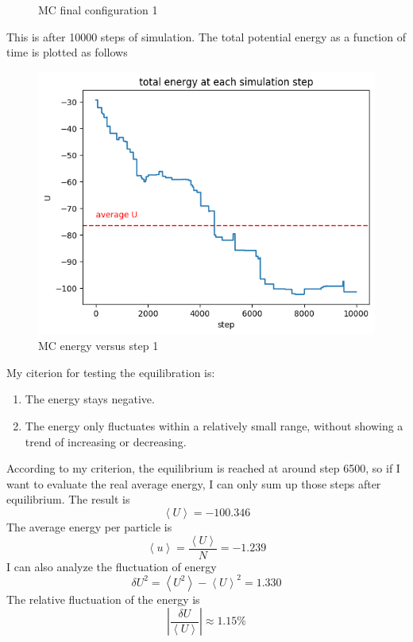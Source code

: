 \documentclass[letterpaper,12pt]{article}
\numberwithin{equation}{section}
\begin{document}
\begin{enumerate}[label=(\alph*)]
\begin{figure}[H]
        \caption{MC final configuration 1}
    \end{figure}
    This is after 10000 steps of simulation. The total potential energy as a function of time is plotted as follows
    \begin{figure}[H]
        \centering
        \includegraphics[width=.8\textwidth]{energy_to_time_mc1.png}
        \caption{MC energy versus step 1}
    \end{figure}
    My citerion for testing the equilibration is:
    \begin{enumerate}[label=\textbullet]
        \item The energy stays negative.
        \item The energy only fluctuates within a relatively small range, without showing a trend of increasing or decreasing.
    \end{enumerate}
    According to my criterion, the equilibrium is reached at around step 6500, so if I want to evaluate the real average energy, I can only sum up those steps after equilibrium. The result is 
    \begin{equation}
        \left \langle U\right\rangle=-100.346
    \end{equation}
    The average energy per particle is 
    \begin{equation}
        \left\langle u\right\rangle=\frac{\left \langle U\right\rangle}{N}=-1.239
    \end{equation}
    I can also analyze the fluctuation of energy
    \begin{equation}
        \delta U^2=\left \langle U^2\right\rangle-\left \langle U\right\rangle^2=1.330
    \end{equation}
    The relative fluctuation of the energy is
    \begin{equation}
        \left| \frac{\delta U}{\left \langle U\right\rangle} \right|\approx 1.15\%
    \end{equation} 


\end{enumerate}
\end{document}
